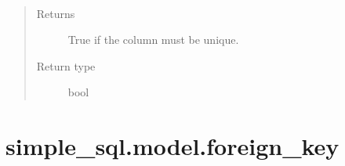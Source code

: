 \documentclass[letterpaper,10pt,english]{sphinxmanual}
\begin{document}
\begin{fulllineitems}
\begin{fulllineitems}
\end{fulllineitems}


\begin{fulllineitems}
\label{\detokenize{model:simple_sql.model.column.Column.is_unique}}~\begin{quote}\begin{description}
\item[{Returns}] \leavevmode
\sphinxAtStartPar
True if the column must be unique.

\item[{Return type}] \leavevmode
\sphinxAtStartPar
bool

\end{description}\end{quote}

\end{fulllineitems}


\end{fulllineitems}



\section{simple\_sql.model.foreign\_key}
\label{\detokenize{model:simple-sql-model-foreign-key}}
\end{document}
